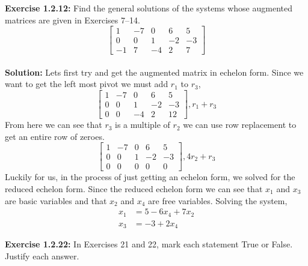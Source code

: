 \documentclass{amsart}
\begin{document}
\vspace{1in}


\noindent\textbf{Exercise 1.2.12: }Find the general solutions of the systems whose augmented matrices are given in Exercises 7–14.\\
\begin{equation}
\begin{bmatrix} 
1&-7&0&6&5\\
0&0&1&-2&-3\\
-1&7&-4&2&7
\end{bmatrix}
\end{equation}
\\
\noindent \textbf{Solution: }
Lets first try and get the augmented matrix in echelon form.  Since we want to get the left most pivot we must add $r_1$ to $r_3$,
\begin{equation}
\begin{bmatrix} 
1&-7&0&6&5\\
0&0&1&-2&-3\\
0&0&-4&2&12
\end{bmatrix}, r_1 + r_3
\end{equation}
From here we can see that $r_3$ is a multiple of $r_2$ we can use row replacement to get an entire row of zeroes.
\begin{equation}
\begin{bmatrix} 
1&-7&0&6&5\\
0&0&1&-2&-3\\
0&0&0&0&0
\end{bmatrix}, 4r_2 + r_3
\end{equation}
Luckily for us, in the process of just getting an echelon form, we solved for the reduced echelon form. Since the reduced echelon form we can see that $x_1$ and $x_3$ are basic variables and that $x_2$ and $x_4$ are free variables. Solving the system,
\begin{align}
x_1&= 5-6x_4+7x_2\\
x_3&= -3+2x_4
\end{align}





\vspace{1in}


\noindent\textbf{Exercise 1.2.22: } In Exercises 21 and 22, mark each statement True or False. Justify each answer.\\ 
\end{document}
